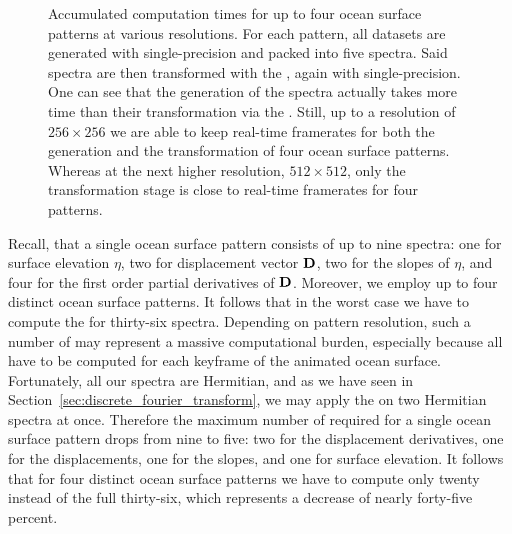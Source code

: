 \begin{figure}
\caption[Accumulated computation times for the generation and transformation
of up to four ocean surface patterns at various resolutions.]{
Accumulated computation times for up to four ocean surface patterns at
various resolutions. For each pattern, all datasets are generated with
single-precision and packed into five spectra. Said spectra are then
transformed with the \IDFT, again with single-precision. One can see that the
generation of the spectra actually takes more time than their transformation
via the \IDFT. Still, up to a resolution of $256 \times 256$ we are
able to keep real-time framerates for both the generation and the transformation
of four ocean surface patterns. Whereas at the next higher resolution,
$512 \times 512$, only the transformation stage is close to real-time
framerates for four patterns.
}
\label{fig:gen:idft}
\end{figure}
%
Recall, that a single ocean surface pattern consists of up to nine spectra:
one for surface elevation $\eta$, two for displacement vector $\mathbf{D}$,
two for the slopes of $\eta$, and four for the first order partial derivatives
of $\mathbf{D}$.
Moreover, we employ up to four distinct ocean surface patterns.
It follows that in the worst case we have to compute the
\InvDiscreteFourierTransform for thirty-six spectra. Depending on pattern
resolution, such a number of \IDFTs may represent a massive computational
burden, especially because all \IDFTs have to be computed for each keyframe
of the animated ocean surface.
Fortunately, all our spectra are Hermitian, and as we have seen in
Section~\ref{sec:discrete_fourier_transform}, we may apply the
\InvDiscreteFourierTransform on two Hermitian spectra at once.
Therefore the maximum number of required \IDFTs for a single ocean surface
pattern drops from nine to five: two for the displacement derivatives,
one for the displacements, one for the slopes, and one for surface elevation.
It follows that for four distinct ocean surface patterns we have to compute
only twenty \IDFTs instead of the full thirty-six, which represents a decrease
of nearly forty-five percent.

